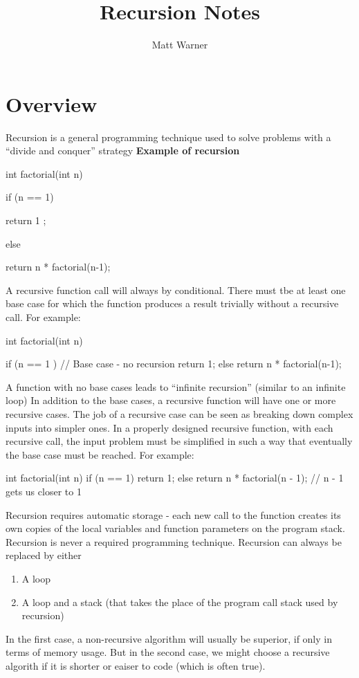 \documentclass{report}
\title{\Huge{Recursion Notes}}
\author{\huge{Matt Warner}}
\date{\huge{}}
\begin{document}
  \maketitle

\section{Overview}

Recursion is a general programming technique used to solve problems with a ``divide and conquer'' strategy
\bigbreak \noindent
{}
\bigbreak \noindent
\textbf{Example of recursion}
\begin{cppcode}
int factorial(int n)
{

  if (n == 1)
  {
  return 1 ;

  }
  else

  {
  return n * factorial(n-1);
  }

}
\end{cppcode}
\bigbreak \noindent
A recursive function call will always by conditional. There must tbe at least one base case for which the function produces a result trivially without a recursive call. For example:
\begin{cppcode}
int factorial(int n){

  if (n == 1 ){   // Base case - no recursion
    return 1;
  }
  else
  {
    return n * factorial(n-1);
  }
}
\end{cppcode}
\bigbreak \noindent
A function with no base cases leads to ``infinite recursion'' (similar to an infinite loop)
\bigbreak \noindent
In addition to the base cases, a recursive function will have one or more recursive cases. The job of a recursive case can be seen as breaking down complex inputs into simpler ones.
\bigbreak \noindent
In a properly designed recursive function, with each recursive call, the input problem must be simplified in such a way that eventually the base case must be reached. For example:
\begin{cppcode}
  int factorial(int n) {
    if (n == 1) {
      return 1;
    }
    else
      return n * factorial(n - 1); // n - 1 gets us closer to 1
  }
\end{cppcode}

\newpage
\noindent Recursion requires automatic storage - each new call to the function creates its own copies of the local variables and function parameters on the program stack.
\bigbreak \noindent
Recursion is never a required programming technique. Recursion can always be replaced by either
\begin{enumerate}
  \item A loop 
  \item A loop and a stack (that takes the place of the program call stack used by recursion)
\end{enumerate}
In the first case, a non-recursive algorithm will usually be superior, if only in terms of memory usage. But in the second case, we might choose a recursive algorith if it is shorter or eaiser to code (which is often true).
\end{document}
